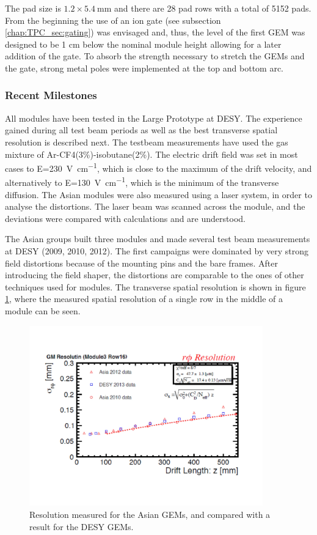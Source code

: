The pad size is $1.2 \times \SI{5.4}{\milli\meter}$ and there are 28 pad rows with a total of 5152 pads.
From the beginning the use of an ion gate
(see subsection \ref{chap:TPC_sec:gating}) was envisaged and, thus, the level of the first GEM was designed
to be 1 cm below the nominal module height allowing for a later addition of the gate. To absorb the strength necessary
to stretch the GEMs and the gate, strong metal poles were implemented at the top and bottom arc.

\subsubsection{Recent Milestones}

All modules have been tested in the Large Prototype at DESY. The experience gained during all test beam periods as
well as the best transverse spatial resolution is described next. The testbeam measurements have used
the gas mixture of Ar-CF4(3\%)-isobutane(2\%). The electric drift field was set in most cases to
E=\SI{230}{\volt\per\centi\meter}, which is close to the maximum of the drift velocity, and alternatively to
E=\SI{130}{\volt\per\centi\meter}, which is the minimum of the transverse diffusion.
The Asian modules were also measured using a laser system, in order to analyse the distortions.
The laser beam was scanned across the module, and the deviations were compared with calculations and are understood.

The Asian groups built three modules and made several test beam measurements at DESY (2009, 2010, 2012).
The first campaigns were dominated by very strong field distortions because of the mounting pins and the bare frames.
After introducing the field shaper, the distortions are comparable to the ones of other techniques used for modules.
The transverse spatial resolution is shown in figure \ref{fig_Fig2asiangemresolution}, where the measured spatial
resolution of a single row in the middle of a module can be seen.

\begin{figure}[!htb]
  \centering
  \includegraphics[width=0.9\textwidth]{plots/TPC-AG_Fig2asiangemresolution.pdf}
  \caption{Resolution measured for the Asian GEMs, and compared with a result for the DESY GEMs.}
  \label{fig_Fig2asiangemresolution}
\end{figure}

